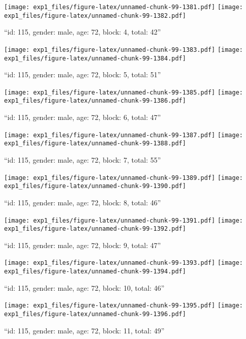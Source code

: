 \documentclass[,]{article}
\begin{document}
\texttt{[image: exp1\_files/figure-latex/unnamed-chunk-99-1381.pdf]}
\texttt{[image: exp1\_files/figure-latex/unnamed-chunk-99-1382.pdf]}

\newpage
[1] 

``id: 115, gender: male, age: 72, block: 4, total: 42''

\texttt{[image: exp1\_files/figure-latex/unnamed-chunk-99-1383.pdf]}
\texttt{[image: exp1\_files/figure-latex/unnamed-chunk-99-1384.pdf]}

\newpage
[1] 

``id: 115, gender: male, age: 72, block: 5, total: 51''

\texttt{[image: exp1\_files/figure-latex/unnamed-chunk-99-1385.pdf]}
\texttt{[image: exp1\_files/figure-latex/unnamed-chunk-99-1386.pdf]}

\newpage
[1] 

``id: 115, gender: male, age: 72, block: 6, total: 47''

\texttt{[image: exp1\_files/figure-latex/unnamed-chunk-99-1387.pdf]}
\texttt{[image: exp1\_files/figure-latex/unnamed-chunk-99-1388.pdf]}

\newpage
[1] 

``id: 115, gender: male, age: 72, block: 7, total: 55''

\texttt{[image: exp1\_files/figure-latex/unnamed-chunk-99-1389.pdf]}
\texttt{[image: exp1\_files/figure-latex/unnamed-chunk-99-1390.pdf]}

\newpage
[1] 

``id: 115, gender: male, age: 72, block: 8, total: 46''

\texttt{[image: exp1\_files/figure-latex/unnamed-chunk-99-1391.pdf]}
\texttt{[image: exp1\_files/figure-latex/unnamed-chunk-99-1392.pdf]}

\newpage
[1] 

``id: 115, gender: male, age: 72, block: 9, total: 47''

\texttt{[image: exp1\_files/figure-latex/unnamed-chunk-99-1393.pdf]}
\texttt{[image: exp1\_files/figure-latex/unnamed-chunk-99-1394.pdf]}

\newpage
[1] 

``id: 115, gender: male, age: 72, block: 10, total: 46''

\texttt{[image: exp1\_files/figure-latex/unnamed-chunk-99-1395.pdf]}
\texttt{[image: exp1\_files/figure-latex/unnamed-chunk-99-1396.pdf]}

\newpage
[1] 

``id: 115, gender: male, age: 72, block: 11, total: 49''
\end{document}
